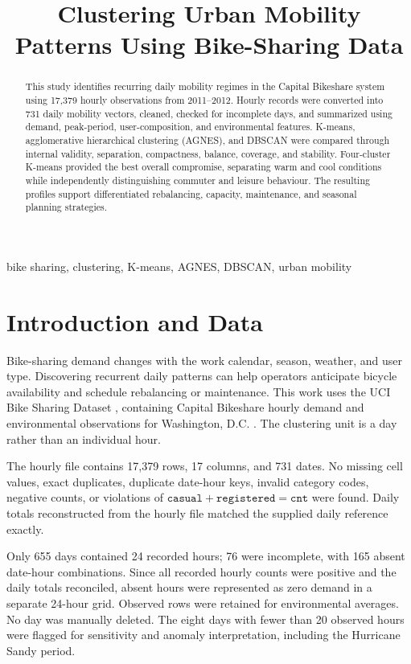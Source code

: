 \documentclass[conference]{IEEEtran}
\title{Clustering Urban Mobility Patterns Using Bike-Sharing Data}
\author{\IEEEauthorblockN{\mbox{J. U. P. Lelwala}}
\IEEEauthorblockA{\mbox{230374E}}}
\begin{document}
\maketitle

\begin{abstract}
This study identifies recurring daily mobility regimes in the Capital Bikeshare system using 17,379 hourly observations from 2011--2012. Hourly records were converted into 731 daily mobility vectors, cleaned, checked for incomplete days, and summarized using demand, peak-period, user-composition, and environmental features. K-means, agglomerative hierarchical clustering (AGNES), and DBSCAN were compared through internal validity, separation, compactness, balance, coverage, and stability. Four-cluster K-means provided the best overall compromise, separating warm and cool conditions while independently distinguishing commuter and leisure behaviour. The resulting profiles support differentiated rebalancing, capacity, maintenance, and seasonal planning strategies.
\end{abstract}

\begin{IEEEkeywords}
bike sharing, clustering, K-means, AGNES, DBSCAN, urban mobility
\end{IEEEkeywords}

\section{Introduction and Data}
Bike-sharing demand changes with the work calendar, season, weather, and user type. Discovering recurrent daily patterns can help operators anticipate bicycle availability and schedule rebalancing or maintenance. This work uses the UCI Bike Sharing Dataset \cite{uci}, containing Capital Bikeshare hourly demand and environmental observations for Washington, D.C. \cite{fanaee}. The clustering unit is a day rather than an individual hour.

The hourly file contains 17,379 rows, 17 columns, and 731 dates. No missing cell values, exact duplicates, duplicate date-hour keys, invalid category codes, negative counts, or violations of \(\texttt{casual}+\texttt{registered}=\texttt{cnt}\) were found. Daily totals reconstructed from the hourly file matched the supplied daily reference exactly.

Only 655 days contained 24 recorded hours; 76 were incomplete, with 165 absent date-hour combinations. Since all recorded hourly counts were positive and the daily totals reconciled, absent hours were represented as zero demand in a separate 24-hour grid. Observed rows were retained for environmental averages. No day was manually deleted. The eight days with fewer than 20 observed hours were flagged for sensitivity and anomaly interpretation, including the Hurricane Sandy period.
\end{document}
